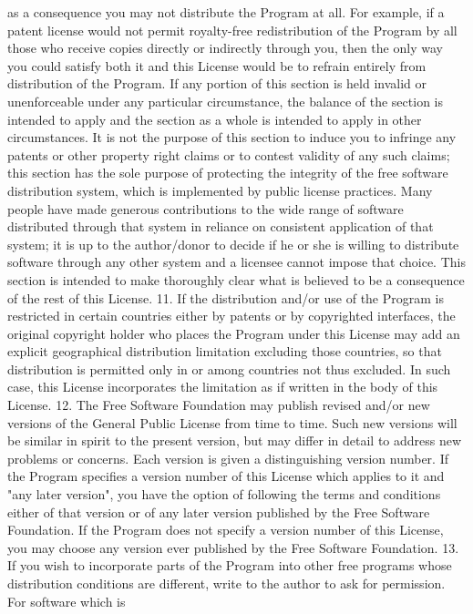 \documentclass[12pt]{article}
\begin{document}
as a consequence you may not distribute the Program at all. For example, if a patent license
would not permit royalty-free redistribution of the Program by all those who receive copies
directly or indirectly through you, then the only way you could satisfy both it and this License
would be to refrain entirely from distribution of the Program. If any portion of this section is
held invalid or unenforceable under any particular circumstance, the balance of the section is
intended to apply and the section as a whole is intended to apply in other circumstances. It is
not the purpose of this section to induce you to infringe any patents or other property right
claims or to contest validity of any such claims; this section has the sole purpose of
protecting the integrity of the free software distribution system, which is implemented by
public license practices. Many people have made generous contributions to the wide range
of software distributed through that system in reliance on consistent application of that
system; it is up to the author/donor to decide if he or she is willing to distribute software
through any other system and a licensee cannot impose that choice. This section is intended
to make thoroughly clear what is believed to be a consequence of the rest of this License.
11. If the distribution and/or use of the Program is restricted in certain countries either by
patents or by copyrighted interfaces, the original copyright holder who places the Program
under this License may add an explicit geographical distribution limitation excluding those
countries, so that distribution is permitted only in or among countries not thus excluded. In
such case, this License incorporates the limitation as if written in the body of this License.
12. The Free Software Foundation may publish revised and/or new versions of the General
Public License from time to time. Such new versions will be similar in spirit to the present
version, but may differ in detail to address new problems or concerns. Each version is given
a distinguishing version number. If the Program specifies a version number of this License
which applies to it and "any later version", you have the option of following the terms and
conditions either of that version or of any later version published by the Free Software
Foundation. If the Program does not specify a version number of this License, you may
choose any version ever published by the Free Software Foundation.
13. If you wish to incorporate parts of the Program into other free programs whose distribution
conditions are different, write to the author to ask for permission. For software which is
\end{document}
